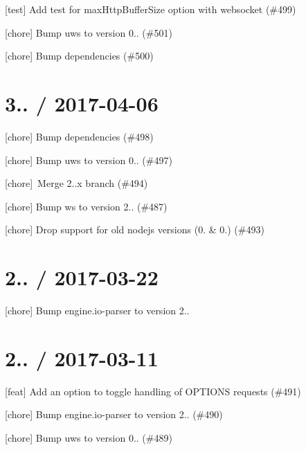 
\begin{DoxyItemize}
\item \mbox{[}test\mbox{]} Add test for max\+Http\+Buffer\+Size option with websocket (\#499)
\item \mbox{[}chore\mbox{]} Bump uws to version 0.. (\#501)
\item \mbox{[}chore\mbox{]} Bump dependencies (\#500)
\end{DoxyItemize}

\section*{3.. / 2017-\/04-\/06 }


\begin{DoxyItemize}
\item \mbox{[}chore\mbox{]} Bump dependencies (\#498)
\item \mbox{[}chore\mbox{]} Bump uws to version 0.. (\#497)
\item \mbox{[}chore\mbox{]} \+Merge 2..\+x branch (\#494)
\item \mbox{[}chore\mbox{]} Bump ws to version 2.. (\#487)
\item \mbox{[}chore\mbox{]} Drop support for old nodejs versions (0. \& 0.) (\#493)
\end{DoxyItemize}

\section*{2.. / 2017-\/03-\/22 }


\begin{DoxyItemize}
\item \mbox{[}chore\mbox{]} Bump engine.\+io-\/parser to version 2..
\end{DoxyItemize}

\section*{2.. / 2017-\/03-\/11 }


\begin{DoxyItemize}
\item \mbox{[}feat\mbox{]} Add an option to toggle handling of O\+P\+T\+I\+O\+NS requests (\#491)
\item \mbox{[}chore\mbox{]} Bump engine.\+io-\/parser to version 2.. (\#490)
\item \mbox{[}chore\mbox{]} Bump uws to version 0.. (\#489)
\end{DoxyItemize}

